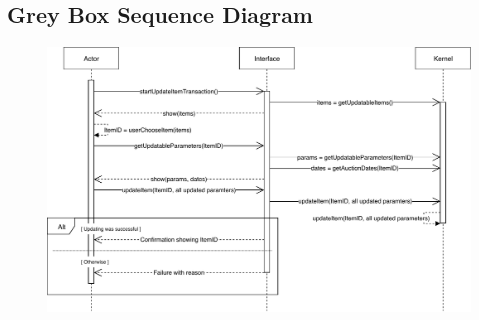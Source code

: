 \subsection*{Grey Box Sequence Diagram}
\begin{figure}[H]
	\centering
	\includegraphics[scale=.9]{uml/SD-gb-update.pdf}
\end{figure}